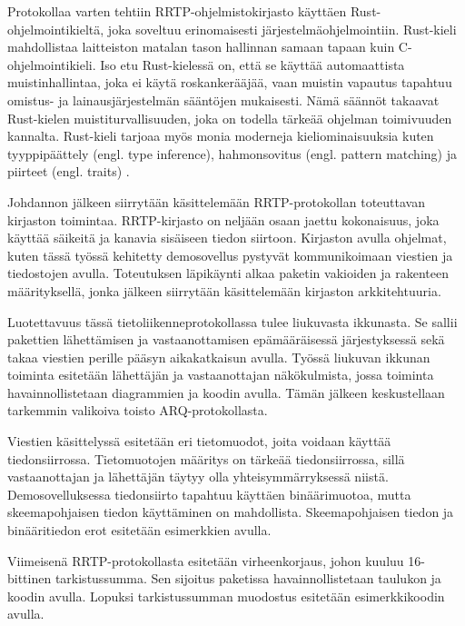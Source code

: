 \documentclass[a4paper,12pt]{article}
\begin{document}
    Protokollaa varten tehtiin RRTP-ohjelmistokirjasto käyttäen Rust-ohjelmointikieltä, joka soveltuu erinomaisesti järjestelmäohjelmointiin. Rust-kieli mahdollistaa laitteiston matalan tason hallinnan
    samaan tapaan kuin C-ohjelmointikieli. Iso etu Rust-kielessä on, että se käyttää automaattista muistinhallintaa, joka ei käytä roskankerääjää, vaan muistin vapautus tapahtuu omistus- ja lainausjärjestelmän sääntöjen mukaisesti.
    Nämä säännöt takaavat Rust-kielen muistiturvallisuuden, joka on todella tärkeää ohjelman toimivuuden kannalta. 
    Rust-kieli tarjoaa myös monia moderneja kieliominaisuuksia kuten tyyppipäättely (engl. type inference), hahmonsovitus (engl. pattern matching) ja piirteet (engl. traits) \cite{rust-book}.

    Johdannon jälkeen siirrytään käsittelemään RRTP-protokollan toteuttavan kirjaston toimintaa. RRTP-kirjasto on neljään osaan jaettu kokonaisuus, joka käyttää säikeitä ja kanavia sisäiseen tiedon siirtoon. Kirjaston avulla ohjelmat, kuten tässä työssä kehitetty demosovellus pystyvät kommunikoimaan viestien ja tiedostojen avulla. 
    Toteutuksen läpikäynti alkaa paketin vakioiden ja rakenteen määrityksellä, jonka jälkeen siirrytään käsittelemään kirjaston arkkitehtuuria. \par

    Luotettavuus tässä tietoliikenneprotokollassa tulee liukuvasta ikkunasta. Se sallii pakettien lähettämisen ja vastaanottamisen epämääräisessä järjestyksessä sekä takaa viestien perille pääsyn aikakatkaisun avulla. Työssä liukuvan ikkunan toiminta esitetään lähettäjän ja vastaanottajan näkökulmista, jossa toiminta havainnollistetaan diagrammien ja koodin avulla. Tämän jälkeen keskustellaan tarkemmin valikoiva toisto ARQ-protokollasta. \par

    Viestien käsittelyssä esitetään eri tietomuodot, joita voidaan käyttää tiedonsiirrossa. Tietomuotojen määritys on tärkeää tiedonsiirrossa, sillä vastaanottajan ja lähettäjän täytyy olla yhteisymmärryksessä niistä. Demosovelluksessa tiedonsiirto tapahtuu käyttäen binäärimuotoa, mutta skeemapohjaisen tiedon käyttäminen on mahdollista. Skeemapohjaisen tiedon ja binääritiedon erot esitetään esimerkkien avulla.\par

    Viimeisenä RRTP-protokollasta esitetään virheenkorjaus, johon kuuluu 16-bittinen tarkistussumma. Sen sijoitus paketissa havainnollistetaan taulukon ja koodin avulla. Lopuksi tarkistussumman muodostus esitetään esimerkkikoodin avulla.\par
\end{document}
